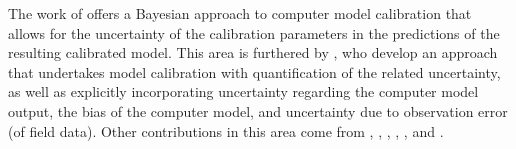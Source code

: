 \documentclass{article}
\begin{document}
The work of \cite{Kennedy2001} offers a Bayesian approach to computer model calibration that allows for the uncertainty of the calibration parameters in the predictions of the resulting calibrated model.
% 
This area is furthered by \cite{Higdon2004}, who develop an approach that undertakes model calibration with quantification of the related uncertainty, as well as explicitly incorporating uncertainty regarding the computer model output, the bias of the computer model, and uncertainty due to observation error (of field data). 
%
Other contributions in this area come from \cite{Williams2006}, \cite{Bayarri}, \cite{Liu2009}, \cite{Bayarri2007}, \cite{Brynjarsdottir2014}, and \cite{Brown2016}.

\end{document}
